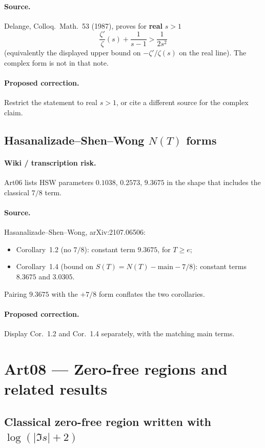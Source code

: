 \documentclass[11pt,a4paper]{article}
\begin{document}
\paragraph{Source.}
Delange, Colloq.\ Math.\ 53 (1987), proves for \textbf{real} $s>1$
\[
\frac{\zeta'}{\zeta}(s)+\frac1{s-1}>\frac1{2s^2}
\]
(equivalently the displayed upper bound on $-\zeta'/\zeta(s)$ on the
real line).  The complex form is not in that note.
\paragraph{Proposed correction.}
Restrict the statement to real $s>1$, or cite a different source for
the complex claim.

\subsection{Hasanalizade--Shen--Wong $N(T)$ forms}
\label{err:hsw-forms}
\paragraph{Wiki / transcription risk.}
Art06 lists HSW parameters $0.1038$, $0.2573$, $9.3675$ in the shape that
includes the classical $7/8$ term.
\paragraph{Source.}
Hasanalizade--Shen--Wong, arXiv:2107.06506:
\begin{itemize}[leftmargin=*]
\item Corollary~1.2 (no $7/8$): constant term $9.3675$, for $T\ge e$;
\item Corollary~1.4 (bound on $S(T)=N(T)-\mathrm{main}-7/8$): constant
  terms $8.3675$ and $3.0305$.
\end{itemize}
Pairing $9.3675$ with the $+7/8$ form conflates the two corollaries.
\paragraph{Proposed correction.}
Display Cor.~1.2 and Cor.~1.4 separately, with the matching main terms.

\section{Art08 --- Zero-free regions and related results}

\subsection{Classical zero-free region written with $\log(|\Im s|+2)$}
\label{err:art08-log-plus-two}
\end{document}
